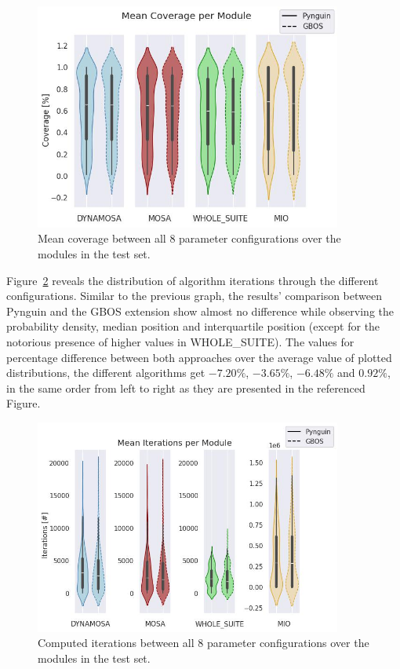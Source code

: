 \documentclass[%
  chapterprefix=false,%
  open=right,%
  twoside=true,%
  paper=a4,%
  logofile={Figures/logo.png},%
  thesistype=master,%
  UKenglish,%
]{se2thesis}
\begin{document}
\begin{figure}[tbh]
  \centering
  \includegraphics[width=0.9\textwidth]{Figures/Results/Coverage.jpg}
  \caption{Mean coverage between all 8 parameter configurations over the modules in the test set.}\label{fig:coverage}
\end{figure}

Figure~\ref{fig:iterations} reveals the distribution of algorithm iterations through the different configurations.
Similar to the previous graph, the results' comparison between Pynguin and the GBOS extension show almost no difference while observing the probability density, median position and interquartile position (except for the notorious presence of higher values in WHOLE\_SUITE).
The values for percentage difference between both approaches over the average value of plotted distributions, the different algorithms get \(-7.20\%\), \(-3.65\%\), \(-6.48\%\) and \(0.92\%\), in the same order from left to right as they are presented in the referenced Figure.

\begin{figure}[th]
  \centering
  \includegraphics[width=0.9\textwidth]{Figures/Results/AlgorithmIterations.jpg}
  \caption{Computed iterations between all 8 parameter configurations over the modules in the test set.}\label{fig:iterations}
\end{figure}
\end{document}
